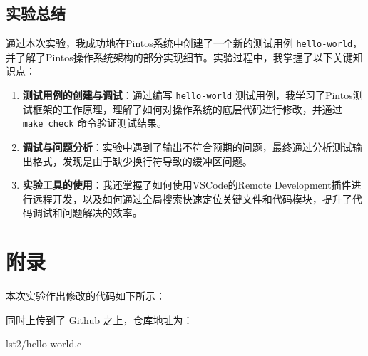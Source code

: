 \subsection{实验总结}

通过本次实验，我成功地在Pintos系统中创建了一个新的测试用例 \texttt{hello-world}，并了解了Pintos操作系统架构的部分实现细节。实验过程中，我掌握了以下关键知识点：

\begin{enumerate}
    \item \textbf{测试用例的创建与调试}：通过编写 \texttt{hello-world} 测试用例，我学习了Pintos测试框架的工作原理，理解了如何对操作系统的底层代码进行修改，并通过 \texttt{make check} 命令验证测试结果。
    
    \item \textbf{调试与问题分析}：实验中遇到了输出不符合预期的问题，最终通过分析测试输出格式，发现是由于缺少换行符导致的缓冲区问题。
    
    \item \textbf{实验工具的使用}：我还掌握了如何使用VSCode的Remote Development插件进行远程开发，以及如何通过全局搜索快速定位关键文件和代码模块，提升了代码调试和问题解决的效率。
\end{enumerate}

\section{附录}

本次实验作出修改的代码如下所示：

同时上传到了 Github 之上，仓库地址为：

 {lst2/hello-world.c}






